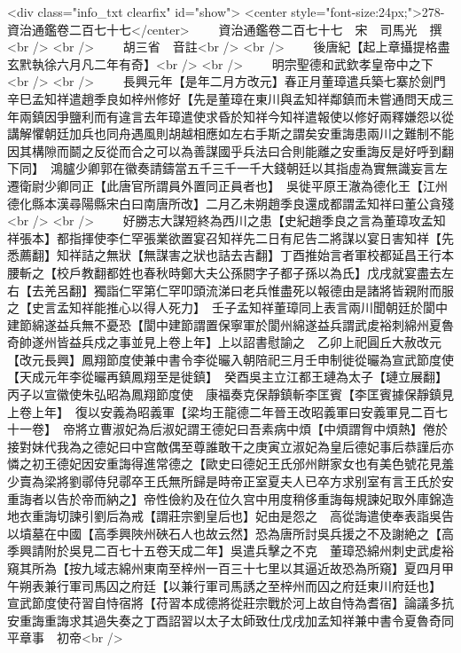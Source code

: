 <div class="info_txt clearfix" id="show">
<center style="font-size:24px;">278-資治通鑑卷二百七十七</center>
  　　資治通鑑卷二百七十七　宋　司馬光　撰<br />
<br />
　　胡三省　音註<br />
<br />
　　後唐紀【起上章攝提格盡玄黓執徐六月凡二年有奇】<br />
<br />
　　明宗聖德和武欽孝皇帝中之下<br />
<br />
　　長興元年【是年二月方改元】春正月董璋遣兵築七寨於劍門辛巳孟知祥遣趙季良如梓州修好【先是董璋在東川與孟知祥鄰鎮而未嘗通問天成三年兩鎮因爭鹽利而有違言去年璋遣使求昏於知祥今知祥遣報使以修好兩釋嫌怨以從講解懼朝廷加兵也同舟遇風則胡越相應如左右手斯之謂矣安重誨患兩川之難制不能因其構隙而鬬之反從而合之可以為善謀國乎兵法曰合則能離之安重誨反是好呼到翻下同】　鴻臚少卿郭在徽奏請鑄當五千三千一千大錢朝廷以其指虛為實無識妄言左遷衛尉少卿同正【此唐官所謂員外置同正員者也】　吳徙平原王澈為德化王【江州德化縣本漢尋陽縣宋白曰南唐所改】二月乙未朔趙季良還成都謂孟知祥曰董公貪殘<br />
<br />
　　好勝志大謀短終為西川之患【史紀趙季良之言為董璋攻孟知祥張本】都指揮使李仁罕張業欲置宴召知祥先二日有尼告二將謀以宴日害知祥【先悉薦翻】知祥詰之無狀【無謀害之狀也詰去吉翻】丁酉推始言者軍校都延昌王行本腰斬之【校戶教翻都姓也春秋時鄭大夫公孫閼字子都子孫以為氏】戊戌就宴盡去左右【去羌呂翻】獨詣仁罕第仁罕叩頭流涕曰老兵惟盡死以報德由是諸將皆親附而服之【史言孟知祥能推心以得人死力】　壬子孟知祥董璋同上表言兩川聞朝廷於閬中建節綿遂益兵無不憂恐【閬中建節謂置保寧軍於閬州綿遂益兵謂武䖍裕刺綿州夏魯奇帥遂州皆益兵戍之事並見上卷上年】上以詔書慰諭之　乙卯上祀圓丘大赦改元【改元長興】鳳翔節度使兼中書令李從曮入朝陪祀三月壬申制徙從曮為宣武節度使【天成元年李從曮再鎮鳳翔至是徙鎮】　癸酉吳主立江都王璉為太子【璉立展翻】　丙子以宣徽使朱弘昭為鳳翔節度使　康福奏克保靜鎮斬李匡賓【李匡賓據保靜鎮見上卷上年】　復以安義為昭義軍【梁均王龍德二年晉王改昭義軍曰安義軍見二百七十一卷】　帝將立曹淑妃為后淑妃謂王德妃曰吾素病中煩【中煩謂胷中煩熱】倦於接對妹代我為之德妃曰中宫敵偶至尊誰敢干之庚寅立淑妃為皇后德妃事后恭謹后亦憐之初王德妃因安重誨得進常德之【歐史曰德妃王氏邠州餅家女也有美色號花見羞少賣為梁將劉鄩侍兒鄩卒王氏無所歸是時帝正室夏夫人已卒方求别室有言王氏於安重誨者以告於帝而納之】帝性儉約及在位久宫中用度稍侈重誨每規諫妃取外庫錦造地衣重誨切諫引劉后為戒【謂莊宗劉皇后也】妃由是怨之　高從誨遣使奉表詣吳告以墳墓在中國【高季興陜州硤石人也故云然】恐為唐所討吳兵援之不及謝絶之【高季興請附於吳見二百七十五卷天成二年】吳遣兵擊之不克　董璋恐綿州刺史武䖍裕窺其所為【按九域志綿州東南至梓州一百三十七里以其逼近故恐為所窺】夏四月甲午朔表兼行軍司馬囚之府廷【以兼行軍司馬誘之至梓州而囚之府廷東川府廷也】　宣武節度使苻習自恃宿將【苻習本成德將從莊宗戰於河上故自恃為耆宿】論議多抗安重誨重誨求其過失奏之丁酉詔習以太子太師致仕戊戌加孟知祥兼中書令夏魯奇同平章事　初帝<br />
